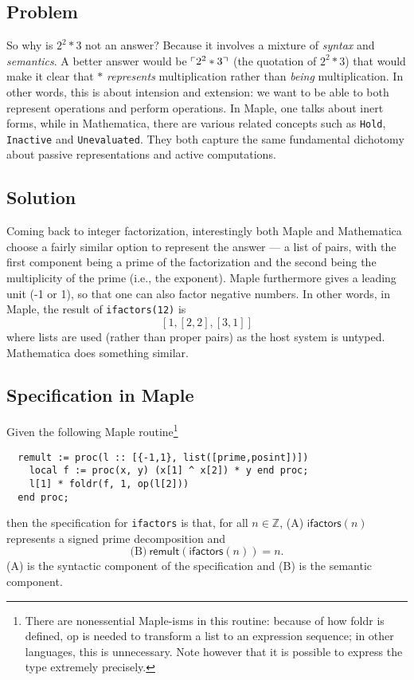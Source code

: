 \documentclass[fleqn]{llncs}
\begin{document}
\subsection{Problem}

So why is $2^2 * 3$ not an answer? Because it involves a mixture of
\emph{syntax} and \emph{semantics}. A better answer would be
$\ulcorner2^2 * 3\urcorner$ (the quotation of $2^2 * 3$) that would
make it clear that $*$ \emph{represents} multiplication
rather than \emph{being} multiplication. In other words, this is about
intension and extension: we want to be able to both represent
operations and perform operations. In Maple, one talks about
\textsf{inert forms}, while in Mathematica, there are various related
concepts such as \texttt{Hold}, \texttt{Inactive} and
\texttt{Unevaluated}.  They both capture the same fundamental
dichotomy about passive representations and active computations.

\subsection{Solution}

Coming back to integer factorization, interestingly both Maple and
Mathematica choose a fairly similar option to represent the answer ---
a list of pairs, with the first component being a prime of the
factorization and the second being the multiplicity of the
prime (i.e., the exponent).  Maple furthermore gives a leading unit
(-1 or 1), so that one can also factor negative numbers. In other
words, in Maple, the result of \texttt{ifactors(12)} is
\[ \left[ 1, \left[2,2\right], \left[3,1\right]\right] \]
where lists are used (rather than proper pairs) as the host system is
untyped.  Mathematica does something similar.

\subsection{Specification in Maple}

Given the following Maple routine\footnote{There are nonessential
  Maple-isms in this routine: because of how \textsf{foldr} is
  defined, \textsf{op} is needed to transform a list to an expression
  sequence; in other languages, this is unnecessary.  Note however
  that it is possible to express the type extremely precisely.}
\begin{verbatim}
  remult := proc(l :: [{-1,1}, list([prime,posint])]) 
    local f := proc(x, y) (x[1] ^ x[2]) * y end proc;
    l[1] * foldr(f, 1, op(l[2]))
  end proc; 
\end{verbatim}
\noindent then the specification for \texttt{ifactors} is that, for
all $n\in \mathbb{Z}$, (A) $\mathsf{ifactors}(n)$ represents a signed
prime decomposition and 
\[ \text{(B)}~\mathsf{remult}\left(\mathsf{ifactors}\left(n\right)\right) = n. \]
(A) is the syntactic component of the specification and (B) is the
semantic component.
\end{document}
